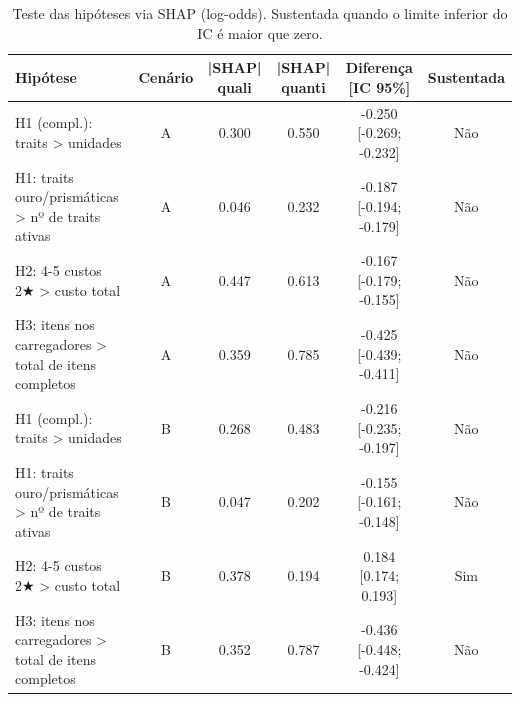 \begin{table}[htbp]
\caption{Teste das hipóteses via SHAP (log-odds). Sustentada quando o limite inferior do IC é maior que zero.}
\label{tab:hipoteses}
\centering
\small
\begin{tabular}{lccccc}
\toprule
Hipótese & Cenário & |SHAP| quali & |SHAP| quanti & Diferença [IC 95\%] & Sustentada \\
\midrule
H1 (compl.): traits > unidades & A & 0.300 & 0.550 & -0.250 [-0.269; -0.232] & Não \\
H1: traits ouro/prismáticas > nº de traits ativas & A & 0.046 & 0.232 & -0.187 [-0.194; -0.179] & Não \\
H2: 4-5 custos 2★ > custo total & A & 0.447 & 0.613 & -0.167 [-0.179; -0.155] & Não \\
H3: itens nos carregadores > total de itens completos & A & 0.359 & 0.785 & -0.425 [-0.439; -0.411] & Não \\
H1 (compl.): traits > unidades & B & 0.268 & 0.483 & -0.216 [-0.235; -0.197] & Não \\
H1: traits ouro/prismáticas > nº de traits ativas & B & 0.047 & 0.202 & -0.155 [-0.161; -0.148] & Não \\
H2: 4-5 custos 2★ > custo total & B & 0.378 & 0.194 & 0.184 [0.174; 0.193] & Sim \\
H3: itens nos carregadores > total de itens completos & B & 0.352 & 0.787 & -0.436 [-0.448; -0.424] & Não \\
\bottomrule
\end{tabular}
\end{table}
